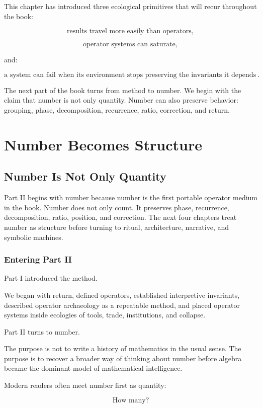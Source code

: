 \documentclass[11pt]{book}
\begin{document}
This chapter has introduced three ecological primitives that will recur throughout the book:

\[
\text{results travel more easily than operators},
\]

\[
\text{operator systems can saturate},
\]

and:

\[
\text{a system can fail when its environment stops preserving the invariants it depends on}.
\]

The next part of the book turns from method to number. We begin with the claim that number is not only quantity. Number can also preserve behavior: grouping, phase, decomposition, recurrence, ratio, correction, and return.

\part{Number Becomes Structure}

\chapter{Number Is Not Only Quantity}

Part II begins with number because number is the first portable operator medium in the book. Number does not only count. It preserves phase, recurrence, decomposition, ratio, position, and correction. The next four chapters treat number as structure before turning to ritual, architecture, narrative, and symbolic machines.

\section{Entering Part II}

Part I introduced the method.

We began with return, defined operators, established interpretive invariants, described operator archaeology as a repeatable method, and placed operator systems inside ecologies of tools, trade, institutions, and collapse.

Part II turns to number.

The purpose is not to write a history of mathematics in the usual sense. The purpose is to recover a broader way of thinking about number before algebra became the dominant model of mathematical intelligence.

Modern readers often meet number first as quantity:

\[
\text{How many?}
\]
\end{document}
